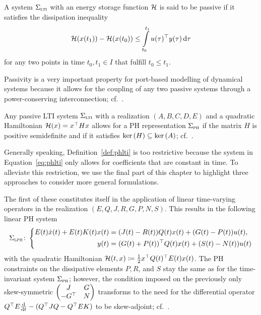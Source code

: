 \begin{definition}\label{def:passivity}
    A system $\Sigma_{\textnormal{\scshape lti}}$ with an energy storage function $\mathcal{H}$ is said to be passive if it satisfies the dissipation inequality
    \begin{equation*}
        \mathcal{H}(x(t_1)) - \mathcal{H}(x(t_0)) \leq \int\limits_{t_0}^{t_1} u(\tau)^{\top} y(\tau) \mathop{}\!\mathrm{d} \tau
    \end{equation*}
    for any two points in time $t_0, t_1 \in I$ that fulfill $t_0 \leq t_1$.
\end{definition}

\begin{remark}
    Passivity is a very important property for port-based modelling of dynamical systems because it allows for the coupling of any two passive systems through a power-conserving interconnection; cf.~\cite[Section~6.4]{Mehrmann2023}.
\end{remark}

\begin{remark}
    Any passive \ac{LTI} system $\Sigma_{\textnormal{\scshape lti}}$ with a realization $(A, B, C, D, E)$ and a quadratic Hamiltonian $\mathcal{H}(x) = x^{\top} H x$ allows for a \ac{PH} representation $\Sigma_{\textnormal{\scshape ph}}$ if the matrix $H$ is positive semidefinite and if it satisfies $\mathop{}\!\mathrm{ker}\left(H\right) \subseteq \mathop{}\!\mathrm{ker}\left(A\right)$; cf.~\cite[Theorem~7.1]{VanDerSchaft2014}.
\end{remark}

Generally speaking, Definition~\ref{def:phlti} is too restrictive because the system in Equation~\eqref{eq:phlti} only allows for coefficients that are constant in time.
To alleviate this restriction, we use the final part of this chapter to highlight three approaches to consider more general formulations.

\begin{remark}
    The first of these constitutes itself in the application of linear time-varying operators in the realization $(E, Q, J, R, G, P, N, S)$.
    This results in the following linear \ac{PH} system
    \begin{equation}\label{eq:lph}
        \Sigma_{\textnormal{\scshape lph}} \colon \left\lbrace
        \begin{aligned}
            E(t) \dot{x}(t) + E(t) K(t) x(t) &= (J(t) - R(t)) Q(t) x(t) + (G(t) - P(t)) u(t), \\
            y(t) &= (G(t) + P(t))^{\top} Q(t) x(t) + (S(t) - N(t)) u(t)
        \end{aligned}
        \right.
    \end{equation}
    with the quadratic Hamiltonian $\mathcal{H}(t, x) \coloneqq \frac{1}{2} x^{\top} Q(t)^{\top} E(t) x(t)$.
    The \ac{PH} constraints on the dissipative elements $P, R$, and $S$ stay the same as for the time-invariant system $\Sigma_{\textnormal{\scshape ph}}$; however, the condition imposed on the previously only skew-symmetric $\begin{pmatrix}
        J & G \\
        -G^{\top} & N
    \end{pmatrix}$ transforms to the need for the differential operator $Q^{\top} E \frac{\mathop{}\!\mathrm{d}}{\mathop{}\!\mathrm{d} t} - (Q^{\top} J Q - Q^{\top} E K)$ to be skew-adjoint; cf.~\cite[Definition~4.8]{Mehrmann2023}.
\end{remark}

